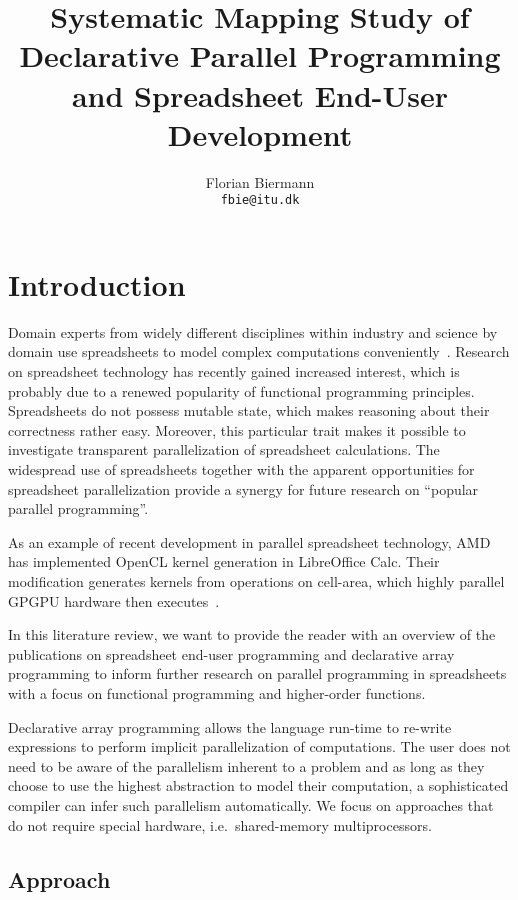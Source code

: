 \documentclass[a4paper]{article}
\title{Systematic Mapping Study of Declarative Parallel Programming
  and Spreadsheet End-User Development}
\author{Florian Biermann\\\small{\texttt{fbie@itu.dk}}}
\begin{document}
\maketitle

\section{Introduction}
\label{sec:intro}

Domain experts from widely different disciplines within industry and
science by domain use spreadsheets to model complex computations
conveniently~\cite{Sestoft2014Spreadsheet}. Research on spreadsheet
technology has recently gained increased interest, which is probably
due to a renewed popularity of functional programming
principles. Spreadsheets do not possess mutable state, which makes
reasoning about their correctness rather easy. Moreover, this
particular trait makes it possible to investigate transparent
parallelization of spreadsheet calculations. The widespread use of
spreadsheets together with the apparent opportunities for spreadsheet
parallelization provide a synergy for future research on ``popular
parallel programming''.

As an example of recent development in parallel spreadsheet
technology, AMD has implemented OpenCL kernel generation in
LibreOffice Calc. Their modification generates kernels from operations
on cell-area, which highly parallel GPGPU hardware then
executes~\cite{Trudeau2015Collaboration}.

In this literature review, we want to provide the reader with an
overview of the publications on spreadsheet end-user programming and
declarative array programming to inform further research on parallel
programming in spreadsheets with a focus on functional programming and
higher-order functions.

Declarative array programming allows the language run-time to re-write
expressions to perform implicit parallelization of computations. The
user does not need to be aware of the parallelism inherent to a
problem and as long as they choose to use the highest abstraction to
model their computation, a sophisticated compiler can infer such
parallelism automatically. We focus on approaches that do not require
special hardware, i.e.\ shared-memory multiprocessors.

\subsection{Approach}
\label{sec:approach}
\end{document}
